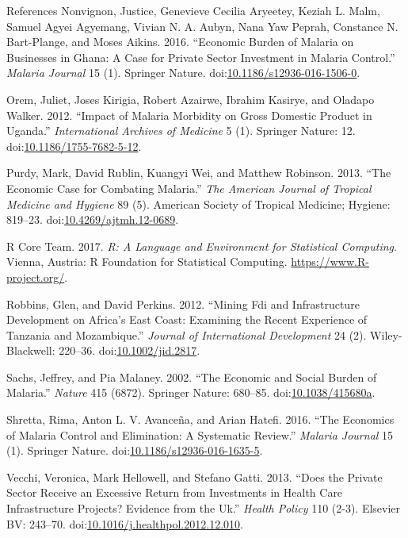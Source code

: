 \documentclass[ignorenonframetext,]{beamer}
\begin{document}
\begin{frame}[allowframebreaks]{References}
\hypertarget{ref-Nonvignon_2016}{}
Nonvignon, Justice, Genevieve Cecilia Aryeetey, Keziah L. Malm, Samuel
Agyei Agyemang, Vivian N. A. Aubyn, Nana Yaw Peprah, Constance N.
Bart-Plange, and Moses Aikins. 2016. ``Economic Burden of Malaria on
Businesses in Ghana: A Case for Private Sector Investment in Malaria
Control.'' \emph{Malaria Journal} 15 (1). Springer Nature.
doi:\href{https://doi.org/10.1186/s12936-016-1506-0}{10.1186/s12936-016-1506-0}.

\hypertarget{ref-Orem_2012}{}
Orem, Juliet, Joses Kirigia, Robert Azairwe, Ibrahim Kasirye, and
Oladapo Walker. 2012. ``Impact of Malaria Morbidity on Gross Domestic
Product in Uganda.'' \emph{International Archives of Medicine} 5 (1).
Springer Nature: 12.
doi:\href{https://doi.org/10.1186/1755-7682-5-12}{10.1186/1755-7682-5-12}.

\hypertarget{ref-Purdy_2013}{}
Purdy, Mark, David Rublin, Kuangyi Wei, and Matthew Robinson. 2013.
``The Economic Case for Combating Malaria.'' \emph{The American Journal
of Tropical Medicine and Hygiene} 89 (5). American Society of Tropical
Medicine; Hygiene: 819--23.
doi:\href{https://doi.org/10.4269/ajtmh.12-0689}{10.4269/ajtmh.12-0689}.

\hypertarget{ref-R}{}
R Core Team. 2017. \emph{R: A Language and Environment for Statistical
Computing}. Vienna, Austria: R Foundation for Statistical Computing.
\url{https://www.R-project.org/}.

\hypertarget{ref-Robbins2012}{}
Robbins, Glen, and David Perkins. 2012. ``Mining Fdi and Infrastructure
Development on Africa's East Coast: Examining the Recent Experience of
Tanzania and Mozambique.'' \emph{Journal of International Development}
24 (2). Wiley-Blackwell: 220--36.
doi:\href{https://doi.org/10.1002/jid.2817}{10.1002/jid.2817}.

\hypertarget{ref-Sachs2002}{}
Sachs, Jeffrey, and Pia Malaney. 2002. ``The Economic and Social Burden
of Malaria.'' \emph{Nature} 415 (6872). Springer Nature: 680--85.
doi:\href{https://doi.org/10.1038/415680a}{10.1038/415680a}.

\hypertarget{ref-Shretta2016}{}
Shretta, Rima, Anton L. V. Avanceña, and Arian Hatefi. 2016. ``The
Economics of Malaria Control and Elimination: A Systematic Review.''
\emph{Malaria Journal} 15 (1). Springer Nature.
doi:\href{https://doi.org/10.1186/s12936-016-1635-5}{10.1186/s12936-016-1635-5}.

\hypertarget{ref-Vecchi_2013}{}
Vecchi, Veronica, Mark Hellowell, and Stefano Gatti. 2013. ``Does the
Private Sector Receive an Excessive Return from Investments in Health
Care Infrastructure Projects? Evidence from the Uk.'' \emph{Health
Policy} 110 (2-3). Elsevier BV: 243--70.
doi:\href{https://doi.org/10.1016/j.healthpol.2012.12.010}{10.1016/j.healthpol.2012.12.010}.


\end{frame}
\end{document}
